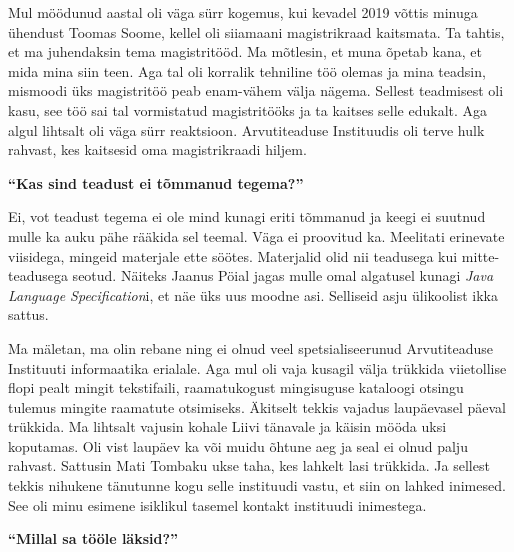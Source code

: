 Mul möödunud aastal 
oli väga sürr kogemus, kui kevadel 2019 võttis minuga ühendust Toomas Soome, kellel
oli siiamaani magistrikraad kaitsmata. Ta tahtis, et ma juhendaksin tema
magistritööd. Ma mõtlesin, et muna õpetab kana, et mida mina siin teen. Aga tal
oli korralik tehniline töö olemas ja mina teadsin, mismoodi üks magistritöö
peab enam-vähem välja nägema. Sellest teadmisest oli kasu, see töö sai tal
vormistatud magistritööks ja ta kaitses selle edukalt. Aga algul lihtsalt oli
väga sürr reaktsioon. Arvutiteaduse Instituudis oli terve hulk rahvast,
kes kaitsesid oma magistrikraadi hiljem.

\textbf{\enquote{Kas sind teadust ei tõmmanud tegema?}}

Ei, vot teadust tegema ei ole mind kunagi eriti tõmmanud ja keegi ei suutnud
mulle ka auku pähe rääkida sel teemal. Väga ei proovitud ka. Meelitati
erinevate viisidega, mingeid materjale ette söötes. Materjalid olid nii
teadusega kui mitte-teadusega seotud. Näiteks Jaanus Pöial jagas mulle omal algatusel kunagi \emph{Java Language Specification}i,
et näe üks uus moodne asi. Selliseid asju ülikoolist ikka sattus.

Ma mäletan, ma olin rebane ning ei olnud veel spetsialiseerunud Arvutiteaduse
Instituuti informaatika erialale. Aga mul oli vaja kusagil välja trükkida
viietollise flopi pealt mingit tekstifaili, raamatukogust mingisuguse kataloogi
otsingu tulemus mingite raamatute otsimiseks. Äkitselt tekkis vajadus
laupäevasel päeval trükkida. Ma lihtsalt vajusin kohale Liivi tänavale ja
käisin mööda uksi koputamas. Oli vist laupäev ka või muidu õhtune aeg ja seal
ei olnud palju rahvast. Sattusin Mati Tombaku ukse
taha, kes lahkelt lasi trükkida. Ja sellest tekkis nihukene tänutunne kogu
selle instituudi vastu, et siin on lahked inimesed. See oli minu esimene
isiklikul tasemel kontakt instituudi inimestega.

\textbf{\enquote{Millal sa tööle läksid?}} 	

